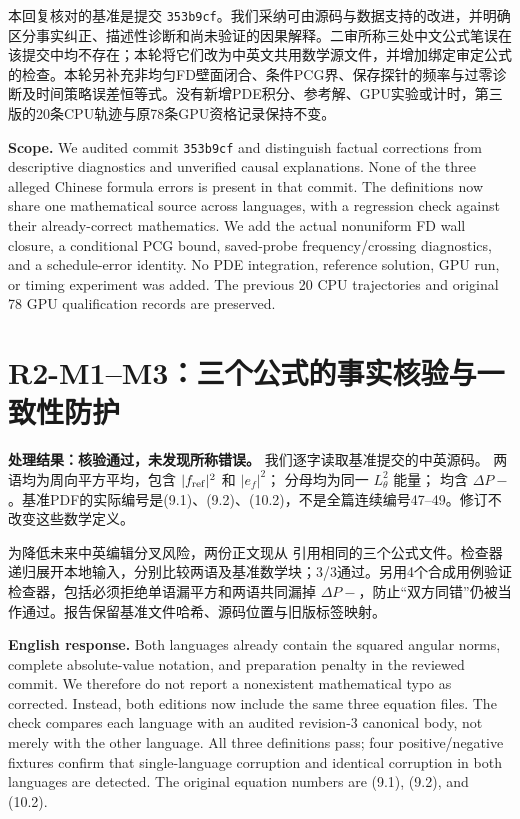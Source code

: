 本回复核对的基准是提交 \texttt{353b9cf}。我们采纳可由源码与数据支持的改进，并明确区分事实纠正、描述性诊断和尚未验证的因果解释。二审所称三处中文公式笔误在该提交中均不存在；本轮将它们改为中英文共用数学源文件，并增加绑定审定公式的检查。本轮另补充非均匀FD壁面闭合、条件PCG界、保存探针的频率与过零诊断及时间策略误差恒等式。没有新增PDE积分、参考解、GPU实验或计时，第三版的20条CPU轨迹与原78条GPU资格记录保持不变。

\noindent\textbf{Scope.}
We audited commit \texttt{353b9cf} and distinguish factual corrections from descriptive diagnostics and unverified causal explanations. None of the three alleged Chinese formula errors is present in that commit. The definitions now share one mathematical source across languages, with a regression check against their already-correct mathematics. We add the actual nonuniform FD wall closure, a conditional PCG bound, saved-probe frequency/crossing diagnostics, and a schedule-error identity. No PDE integration, reference solution, GPU run, or timing experiment was added. The previous 20 CPU trajectories and original 78 GPU qualification records are preserved.

\section{R2-M1--M3：三个公式的事实核验与一致性防护}
\textbf{处理结果：核验通过，未发现所称错误。}
我们逐字读取基准提交的中英源码。 两语均为周向平方平均，包含 $|f_{\rm ref}|^2$ 和 $|e_f|^2$； 分母均为同一 $L^2_\theta$ 能量； 均含 $\Delta P-$。基准PDF的实际编号是(9.1)、(9.2)、(10.2)，不是全篇连续编号47--49。修订不改变这些数学定义。

为降低未来中英编辑分叉风险，两份正文现从  引用相同的三个公式文件。检查器递归展开本地输入，分别比较两语及基准数学块；3/3通过。另用4个合成用例验证检查器，包括必须拒绝单语漏平方和两语共同漏掉 $\Delta P-$，防止“双方同错”仍被当作通过。报告保留基准文件哈希、源码位置与旧版标签映射。

\noindent\textbf{English response.}
Both languages already contain the squared angular norms, complete absolute-value notation, and preparation penalty in the reviewed commit. We therefore do not report a nonexistent mathematical typo as corrected. Instead, both editions now include the same three equation files. The check compares each language with an audited revision-3 canonical body, not merely with the other language. All three definitions pass; four positive/negative fixtures confirm that single-language corruption and identical corruption in both languages are detected. The original equation numbers are (9.1), (9.2), and (10.2).

